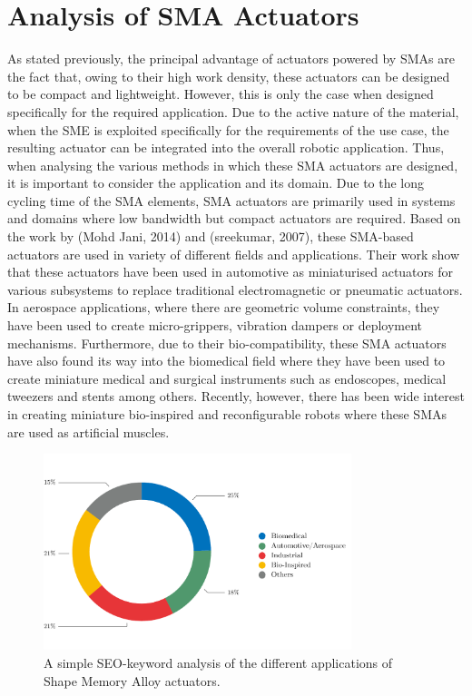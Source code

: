 \section{Analysis of SMA Actuators}
As stated previously, the principal advantage of actuators powered by SMAs are the fact that, owing to their high work density, these actuators can be designed to be compact and lightweight. However, this is only the case when designed specifically for the required application. Due to the active nature of the material, when the SME is exploited specifically for the requirements of the use case, the resulting actuator can be integrated into the overall robotic application. Thus, when analysing the various methods in which these SMA actuators are designed, it is important to consider the application and its domain. Due to the long cycling time of the SMA elements, SMA actuators are primarily used in systems and domains where low bandwidth but compact actuators are required. Based on the work by \todocite (Mohd Jani, 2014) and \todocite (sreekumar, 2007), these SMA-based actuators are used in variety of different fields and applications. Their work show that these actuators have been used in automotive as miniaturised actuators for various subsystems to replace traditional electromagnetic or pneumatic actuators. In aerospace applications, where there are geometric volume constraints, they have been used to create micro-grippers, vibration dampers or deployment mechanisms. Furthermore, due to their bio-compatibility, these SMA actuators have also found its way into the biomedical field where they have been used to create miniature medical and surgical instruments such as endoscopes, medical tweezers and stents among others. Recently, however, there has been wide interest in creating miniature bio-inspired and reconfigurable robots where these SMAs are used as artificial muscles.

\begin{figure}[hbt!]
    \centering
    \includegraphics[width=0.8\textwidth]{images/chap1/domain-donut-chart.pdf}
    \caption{A simple SEO-keyword analysis of the different applications of Shape Memory Alloy actuators.}
    \label{fig:domain-donut-chart}
\end{figure}

